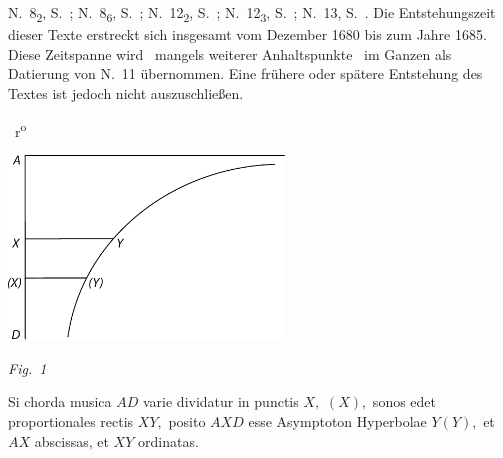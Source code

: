 \begin{ledgroup}
N.~8\textsubscript{2}, S.~;
N.~8\textsubscript{6}, S.~;
N.~12\textsubscript{2}, S.~;
N.~12\textsubscript{3}, S.~;
N.~13, S.~.%
Die Entstehungszeit dieser Texte erstreckt sich ins\-ge\-samt vom Dezember 1680 bis zum Jahre 1685.
Diese Zeitspanne wird \textendash\ mangels weiterer Anhaltspunkte \textendash\ im Ganzen als Datierung von N.~11 übernommen.
Eine frühere oder spätere Entstehung des Textes ist jedoch nicht auszuschließen.

\pend
\end{ledgroup}
%
\vspace{8mm}
\pstart%
\normalsize%
\noindent%
%
~r\textsuperscript{o}\rbrack\ %
%
\pend%
%
%
  \vspace{1.0em}%
  \centerline{\includegraphics[width=0.55\textwidth]{gesamttex/edit_VIII,3/images/LH_37_01_026_d1.pdf}}%
  \vspace{0.5em}
  \centerline{\lbrack\textit{Fig.~1}\rbrack}%
  \newpage%
%
%
\pstart%
\noindent%
Si chorda musica\protect{} $AD$ varie dividatur in punctis $X,$ $(X),$
sonos\protect{} edet proportionales rectis $XY,$
posito $AXD$ esse Asymptoton Hyperbolae $Y(Y),$\protect{}
et $AX$ abscissas, et $XY$ ordinatas.
